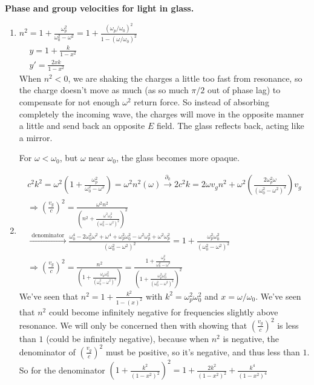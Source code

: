 \documentclass[twoside,10pt]{amsart}
\newcommand{\problemhead}[1]
  {\smallskip
   \noindent{\large\bf Problem #1.}
   \smallskip}
\begin{document}
\problemhead{6.18} \textbf{ Phase and group velocities for light in glass.}
\begin{enumerate}
\item $n^2 = 1 + \frac{ \omega_p^2}{ \omega_0^2 - \omega^2 } = 1 + \frac{ (\omega_p/\omega_0)^2 }{ 1 - (\omega/\omega_0)^2 }$ \\
$\begin{aligned}
  & y = 1 + \frac{k}{1-x^2} \\
  & y' = \frac{2xk}{1-x^2 }
\end{aligned}$ \smallskip \\
 When $n^2 < 0$, we are shaking the charges a little too fast from resonance, so the charge doesn't move as much (as so much $\pi/2$ out of phase lag) to compensate for not enough $\omega^2$ return force.  So instead of absorbing completely the incoming wave, the charges will move in the opposite manner a little and send back an opposite $E$ field.  The glass reflects back, acting like a mirror.  

For $\omega < \omega_0$, but $\omega$ near $\omega_0$, the glass becomes more opaque.  
\item 
\[
\begin{gathered}
  c^2 k^2 = \omega^2 \left( 1 + \frac{\omega_p^2}{ \omega_0^2 - \omega^2 } \right) = \omega^2 n^2(\omega) \xrightarrow{ \partial_k} 2 c^2 k = 2 \omega v_g n^2 + \omega^2 \left( \frac{2 \omega_p^2 \omega }{ (\omega_0^2 - \omega^2 )^2 } \right)v_g \\
  \Longrightarrow \left( \frac{v_g}{c} \right)^2 = \frac{ \omega^2 n^2 }{ (n^2 + \frac{ \omega^2 \omega_p^2 }{ (\omega_0^2 - \omega^2 )^2 } )^2 } \\
  \xrightarrow{\text{ denominator } } \frac{ \omega_0^4 - 2 \omega_0^2 \omega^2 + \omega^4 + \omega_p^2 \omega_0^2 - \omega^2 \omega_p^2 + \omega^2 \omega_p^2 }{ (\omega_0^2 - \omega^2 )^2 } = 1 + \frac{ \omega_p^2 \omega_0^2 }{ (\omega_0^2 - \omega^2 )^2 } \\
  \Longrightarrow \boxed{ \left( \frac{v_g}{c} \right)^2 = \frac{ n^2}{ \left( 1 + \frac{ \omega_p \omega_0^2}{ (\omega_0^2 - \omega^2)^2 } \right) } = \frac{ 1 + \frac{ \omega_p^2 }{ \omega_0^2 - \omega^2 }}{ \left( 1 + \frac{ \omega_p^2 \omega_0^2 }{ (\omega_0^2 - \omega^2 )^2 } \right)^2 } }
\end{gathered}
\]
We've seen that $n^2 = 1 + \frac{k^2}{ 1 - (x)^2 }$ with $k^2 = \omega_p^2 \omega_0^2$ and $x = \omega/\omega_0$.  We've seen that $n^2$ could become infinitely negative for frequencies slightly above resonance.  We will only be concerned then with showing that $\left( \frac{v_g}{c} \right)^2$ is less than $1$ (could be infinitely negative), because when $n^2$ is negative, the denominator of $\left( \frac{v_g}{c} \right)^2$ must be positive, so it's negative, and thus less than $1$.  \smallskip \\
So for the denominator $\left( 1 + \frac{k^2}{ (1-x^2)^2 } \right)^2 = 1 + \frac{2k^2}{(1-x^2)^2 } + \frac{k^4}{(1-x^2)^4 }$


\end{enumerate}
\end{document}
